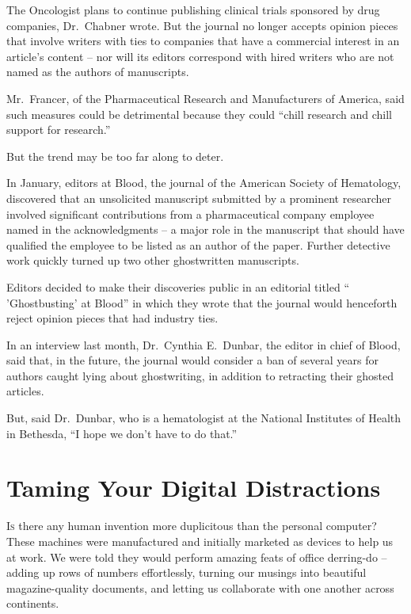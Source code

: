 ﻿\documentclass[12pt]{article}
\begin{document}
The Oncologist plans to continue publishing clinical trials sponsored by drug companies, Dr.~Chabner
wrote. But the journal no longer accepts opinion pieces that involve writers with ties to companies
that have a commercial interest in an article's content -- nor will its editors correspond with
hired writers who are not named as the authors of manuscripts.

Mr.~Francer, of the Pharmaceutical Research and Manufacturers of America, said such measures could
be detrimental because they could ``chill research and chill support for research.''

But the trend may be too far along to deter.

In January, editors at Blood, the journal of the American Society of Hematology, discovered that an
unsolicited manuscript submitted by a prominent researcher involved significant contributions from a
pharmaceutical company employee named in the acknowledgments -- a major role in the manuscript that
should have qualified the employee to be listed as an author of the paper. Further detective work
quickly turned up two other ghostwritten manuscripts.

Editors decided to make their discoveries public in an editorial titled `` 'Ghostbusting' at Blood''
in which they wrote that the journal would henceforth reject opinion pieces that had industry ties.

In an interview last month, Dr.~Cynthia E.~Dunbar, the editor in chief of Blood, said that, in the
future, the journal would consider a ban of several years for authors caught lying about
ghostwriting, in addition to retracting their ghosted articles.

But, said Dr.~Dunbar, who is a hematologist at the National Institutes of Health in Bethesda, ``I
hope we don't have to do that.''

\section{Taming Your Digital Distractions}

\lettrine{I}{s} there any human invention more duplicitous than the personal computer? These
machines were manufactured and initially marketed as devices to help us at work. We were told they
would perform amazing feats of office derring-do -- adding up rows of numbers effortlessly, turning
our musings into beautiful magazine-quality documents, and letting us collaborate with one another
across continents.
\end{document}
